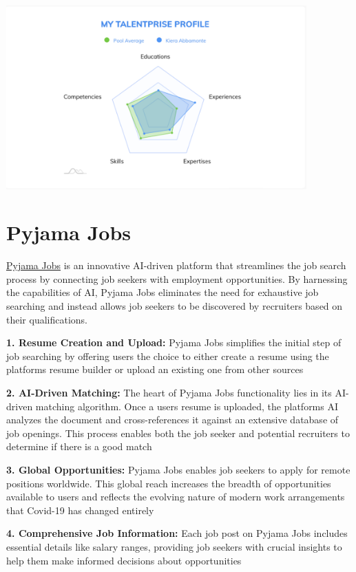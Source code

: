 \documentclass[
]{book}
\begin{document}
\includegraphics[width=4.54167in,height=\textheight]{talentprise 2.png}

\hypertarget{pyjama-jobs}{%
\section{Pyjama Jobs}\label{pyjama-jobs}}

\href{https://www.kickresume.com/pyjama-jobs/}{Pyjama Jobs} is an innovative AI-driven platform that streamlines the job search process by connecting job seekers with employment opportunities. By harnessing the capabilities of AI, Pyjama Jobs eliminates the need for exhaustive job searching and instead allows job seekers to be discovered by recruiters based on their qualifications.

\textbf{1. Resume Creation and Upload:} Pyjama Jobs simplifies the initial step of job searching by offering users the choice to either create a resume using the platform\textquotesingle s resume builder or upload an existing one from other sources

\textbf{2. AI-Driven Matching:} The heart of Pyjama Jobs\textquotesingle{} functionality lies in its AI-driven matching algorithm. Once a user\textquotesingle s resume is uploaded, the platform\textquotesingle s AI analyzes the document and cross-references it against an extensive database of job openings. This process enables both the job seeker and potential recruiters to determine if there is a good match

\textbf{3. Global Opportunities:} Pyjama Jobs enables job seekers to apply for remote positions worldwide. This global reach increases the breadth of opportunities available to users and reflects the evolving nature of modern work arrangements that Covid-19 has changed entirely

\textbf{4. Comprehensive Job Information:} Each job post on Pyjama Jobs includes essential details like salary ranges, providing job seekers with crucial insights to help them make informed decisions about opportunities
\end{document}
